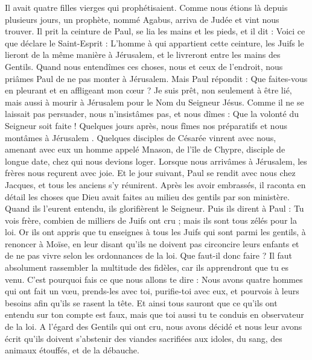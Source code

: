 \begin{multicols}{2}
Il avait quatre filles vierges qui prophétisaient.
Comme nous étions là depuis plusieurs jours, un prophète, nommé Agabus, arriva de Judée
et vint nous trouver. Il prit la ceinture de Paul, se lia les mains et les pieds, et il dit : Voici ce que déclare le Saint-Esprit : L’homme à qui appartient cette ceinture, les Juifs le lieront de la même manière à Jérusalem, et le livreront entre les mains des Gentils.
Quand nous entendîmes ces choses, nous et ceux de l’endroit, nous priâmes Paul de ne pas monter à Jérusalem.
Mais Paul répondit : Que faites-vous en pleurant et en affligeant mon cœur ? Je suis prêt, non seulement à être lié, mais aussi à mourir à Jérusalem pour le Nom du Seigneur Jésus.
Comme il ne se laissait pas persuader, nous n’insistâmes pas, et nous dîmes : Que la volonté du Seigneur soit faite !
Quelques jours après, nous fîmes nos préparatifs et nous montâmes à Jérusalem .
Quelques disciples de Césarée vinrent avec nous, amenant avec eux un homme appelé Mnason, de l’île de Chypre, disciple de longue date, chez qui nous devions loger.
Lorsque nous arrivâmes à Jérusalem, les frères nous reçurent avec joie.
Et le jour suivant, Paul se rendit avec nous chez Jacques, et tous les anciens s’y réunirent.
Après les avoir embrassés, il raconta en détail les choses que Dieu avait faites au milieu des gentils par son ministère.
Quand ils l’eurent entendu, ils glorifièrent le Seigneur. Puis ils dirent à Paul : Tu vois frère, combien de milliers de Juifs ont cru ; mais ils sont tous zélés pour la loi.
Or ils ont appris que tu enseignes à tous les Juifs qui sont parmi les gentils, à renoncer à Moïse, en leur disant qu’ils ne doivent pas circoncire leurs enfants et de ne pas vivre selon les ordonnances de la loi.
Que faut-il donc faire ? Il faut absolument rassembler la multitude des fidèles, car ils apprendront que tu es venu.
C’est pourquoi fais ce que nous allons te dire : Nous avons quatre hommes qui ont fait un vœu,
prends-les avec toi, purifie-toi avec eux, et pourvois à leurs besoins afin qu'ils se rasent la tête. Et ainsi tous sauront que ce qu’ils ont entendu sur ton compte est faux, mais que toi aussi tu te conduis en observateur de la loi.
A l'égard des Gentils qui ont cru, nous avons décidé et nous leur avons écrit qu’ils doivent s’abstenir des viandes sacrifiées aux idoles, du sang, des animaux étouffés, et de la débauche.

\end{multicols}
